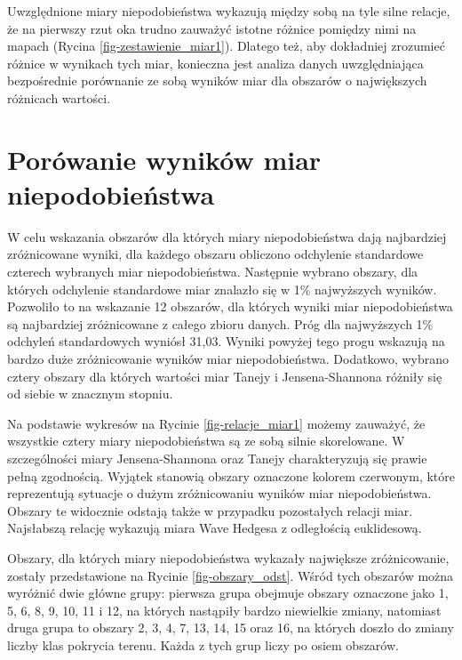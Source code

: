 \documentclass{amuthesis}
\begin{document}
Uwzględnione miary niepodobieństwa wykazują między sobą na tyle silne
relacje, że na pierwszy rzut oka trudno zauważyć istotne różnice
pomiędzy nimi na mapach (Rycina \ref{fig-zestawienie_miar1}). Dlatego
też, aby dokładniej zrozumieć różnice w wynikach tych miar, konieczna
jest analiza danych uwzględniająca bezpośrednie porównanie ze sobą
wyników miar dla obszarów o największych różnicach wartości.

\hypertarget{poruxf3wanie-wynikuxf3w-miar-niepodobieux144stwa}{%
\section{Porówanie wyników miar
niepodobieństwa}\label{poruxf3wanie-wynikuxf3w-miar-niepodobieux144stwa}}

W celu wskazania obszarów dla których miary niepodobieństwa dają
najbardziej zróżnicowane wyniki, dla każdego obszaru obliczono
odchylenie standardowe czterech wybranych miar niepodobieństwa.
Następnie wybrano obszary, dla których odchylenie standardowe miar
znalazło się w 1\% najwyższych wyników. Pozwoliło to na wskazanie 12
obszarów, dla których wyniki miar niepodobieństwa są najbardziej
zróżnicowane z całego zbioru danych. Próg dla najwyższych 1\% odchyleń
standardowych wyniósł 31,03. Wyniki powyżej tego progu wskazują na
bardzo duże zróżnicowanie wyników miar niepodobieństwa. Dodatkowo,
wybrano cztery obszary dla których wartości miar Tanejy i
Jensena-Shannona różniły się od siebie w znacznym stopniu.

Na podstawie wykresów na Rycinie \ref{fig-relacje_miar1} możemy
zauważyć, że wszystkie cztery miary niepodobieństwa są ze sobą silnie
skorelowane. W szczególności miary Jensena-Shannona oraz Tanejy
charakteryzują się prawie pełną zgodnością. Wyjątek stanowią obszary
oznaczone kolorem czerwonym, które reprezentują sytuacje o dużym
zróżnicowaniu wyników miar niepodobieństwa. Obszary te widocznie odstają
także w przypadku pozostałych relacji miar. Najsłabszą relację wykazują
miara Wave Hedgesa z odległością euklidesową.

Obszary, dla których miary niepodobieństwa wykazały największe
zróżnicowanie, zostały przedstawione na Rycinie \ref{fig-obszary_odst}.
Wśród tych obszarów można wyróżnić dwie główne grupy: pierwsza grupa
obejmuje obszary oznaczone jako 1, 5, 6, 8, 9, 10, 11 i 12, na których
nastąpiły bardzo niewielkie zmiany, natomiast druga grupa to obszary 2,
3, 4, 7, 13, 14, 15 oraz 16, na których doszło do zmiany liczby klas
pokrycia terenu. Każda z tych grup liczy po osiem obszarów.
\end{document}
